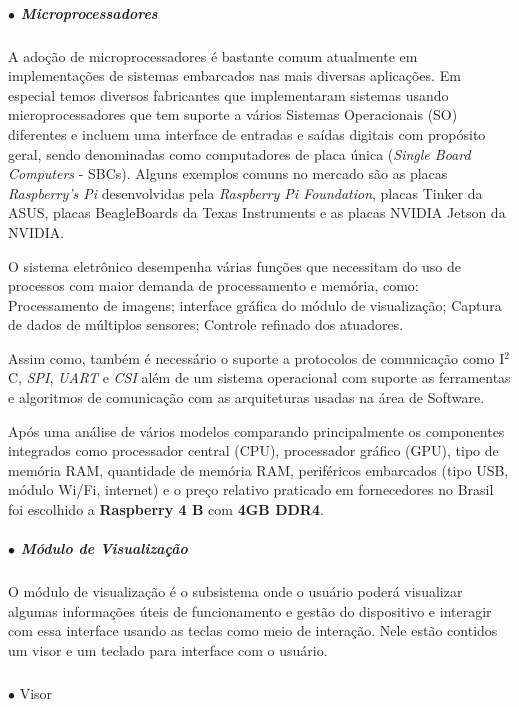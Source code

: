 \newpage
    \subparagraph*{$\bullet$ Microprocessadores}  \hfill
    
    A adoção de microprocessadores é bastante comum atualmente em implementações de sistemas embarcados nas mais diversas aplicações. Em especial temos diversos fabricantes que implementaram sistemas usando microprocessadores que tem suporte a vários Sistemas Operacionais (SO) diferentes e incluem uma interface de entradas e saídas digitais com propósito geral, sendo denominadas como computadores de placa única (\textit{Single Board Computers} - SBCs). Alguns exemplos comuns no mercado são as placas \textit{Raspberry's Pi} desenvolvidas pela \textit{Raspberry Pi Foundation}, placas Tinker da ASUS, placas BeagleBoards da Texas Instruments e as placas NVIDIA Jetson da NVIDIA. 
    
    O sistema eletrônico desempenha várias funções que necessitam do uso de processos com maior demanda de processamento e memória, como: Processamento de imagens; interface gráfica do módulo de visualização; Captura de dados de múltiplos sensores; Controle refinado dos atuadores.
    
    Assim como, também é necessário o suporte a protocolos de comunicação como I$^2$C, \textit{SPI}, \textit{UART} e \textit{CSI} além de um sistema operacional com suporte as ferramentas e algoritmos de comunicação com as arquiteturas usadas na área de Software.
    
    Após uma análise de vários modelos comparando principalmente os componentes integrados como processador central (CPU), processador gráfico (GPU), tipo de memória RAM, quantidade de memória RAM, periféricos embarcados (tipo USB, módulo Wi/Fi, internet) e o preço relativo praticado em fornecedores no Brasil foi escolhido a \textbf{Raspberry 4 B} com \textbf{4GB DDR4}.
    
    
    \subparagraph*{$\bullet$ Módulo de Visualização} \hfill
    
    O módulo de visualização é o subsistema onde o usuário poderá visualizar algumas informações úteis de funcionamento e gestão do dispositivo e interagir com essa interface usando as teclas como meio de interação. Nele estão contidos um visor e um teclado para interface com o usuário.


        \subparagraph*{}$\bullet$ Visor \hfill
        
